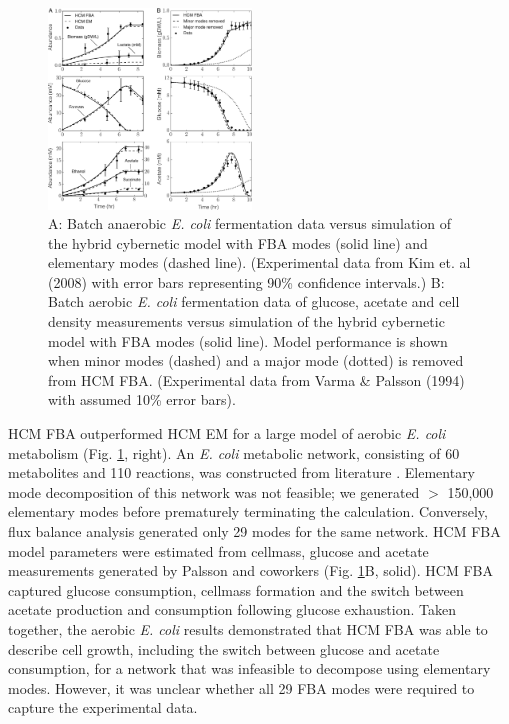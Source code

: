 \documentclass[10pt,twocolumn,twoside,final]{IEEEtran}
\begin{document}
\begin{figure}[!t]\centering
\includegraphics[width=0.48\textwidth]{./figs/Fig-2-Ecoli-SimulationResults.pdf}
\caption{A: Batch anaerobic \textit{E. coli} fermentation data versus simulation of the hybrid cybernetic model with FBA modes (solid line) and elementary modes (dashed line). (Experimental data from Kim et. al (2008)\cite{2008_kim_varner_ramkrishna_BiotechProg} with error bars representing 90\% confidence intervals.) B: Batch aerobic \textit{E. coli} fermentation data of glucose, acetate and cell density measurements versus simulation of the hybrid cybernetic model with FBA modes (solid line). Model performance is shown when minor modes (dashed) and a major mode (dotted) is removed from HCM FBA. (Experimental data from Varma \& Palsson (1994)\cite{1994_varma_palsson_ApplEnvMicro} with assumed 10\% error bars).}
\label{fig:ecoli}
\end{figure}

HCM FBA outperformed HCM EM for a large model of aerobic \textit{E. coli} metabolism (Fig. \ref{fig:ecoli}, right).
An \emph{E. coli} metabolic network, consisting of 60 metabolites and 110 reactions, was constructed from literature \cite{2007_schuetz_etal_MolSysBio,2006_Palsson_model}.
Elementary mode decomposition of this network was not feasible; we generated $>$ 150,000 elementary modes before prematurely terminating the calculation.
Conversely, flux balance analysis generated only 29 modes for the same network.
HCM FBA model parameters were estimated from cellmass, glucose and acetate measurements generated by Palsson and coworkers \cite{1994_varma_palsson_ApplEnvMicro} (Fig. \ref{fig:ecoli}B, solid).
HCM FBA captured glucose consumption, cellmass formation and the switch between acetate production and consumption following glucose exhaustion.
Taken together, the aerobic \textit{E. coli} results demonstrated that HCM FBA was able to describe cell growth, including the switch between glucose and acetate consumption,
for a network that was infeasible to decompose using elementary modes.
However, it was unclear whether all 29 FBA modes were required to capture the experimental data.
\end{document}
